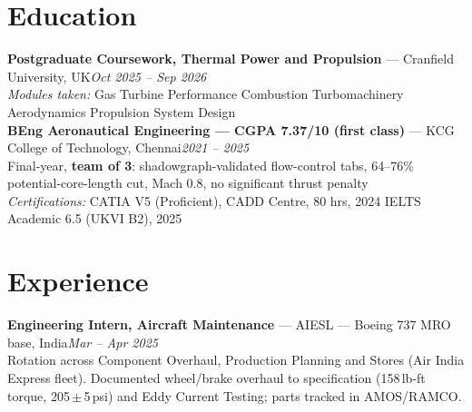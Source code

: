 \documentclass[10pt,a4paper]{article}
\newcommand{\sep}{\quad\textperiodcentered\quad}
\newcommand{\oneline}[3]{\textbf{#1} --- {#2}\hfill \textit{#3}\\}
\begin{document}
\section{Education}
\oneline{Postgraduate Coursework, Thermal Power and Propulsion}{Cranfield University, UK}{Oct 2025 -- Sep 2026}
{\small \textit{Modules taken:} Gas Turbine Performance \sep Combustion \sep Turbomachinery Aerodynamics \sep Propulsion System Design}\\[0.05em]
\oneline{BEng Aeronautical Engineering --- CGPA 7.37/10 (first class)}{KCG College of Technology, Chennai}{2021 -- 2025}
{\small Final-year, \textbf{team of 3}: shadowgraph-validated flow-control tabs, 64--76\% potential-core-length cut, Mach 0.8, no significant thrust penalty}\\[0.05em]
{\small \textit{Certifications:} CATIA V5 (Proficient), CADD Centre, 80 hrs, 2024 \sep IELTS Academic 6.5 (UKVI B2), 2025}

\section{Experience}
\oneline{Engineering Intern, Aircraft Maintenance}{AIESL --- Boeing 737 MRO base, India}{Mar -- Apr 2025}
{\small Rotation across Component Overhaul, Production Planning and Stores (Air India Express fleet). Documented wheel/brake overhaul to specification (158\,lb-ft torque, 205\,$\pm$\,5\,psi) and Eddy Current Testing; parts tracked in AMOS/RAMCO.}
\end{document}
